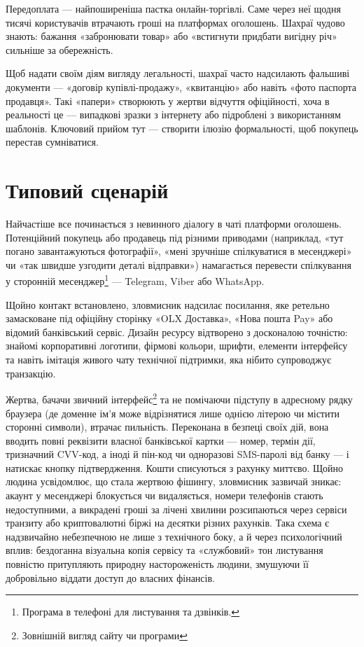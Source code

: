 Передоплата — найпоширеніша пастка онлайн-торгівлі. Саме через неї щодня тисячі користувачів втрачають гроші на платформах оголошень. Шахраї чудово знають: бажання «забронювати товар» або «встигнути придбати вигідну річ» сильніше за обережність.  

Щоб надати своїм діям вигляду легальності, шахраї часто надсилають фальшиві документи — «договір купівлі-продажу», «квитанцію» або навіть «фото паспорта продавця». Такі «папери» створюють у жертви відчуття офіційності, хоча в реальності це — випадкові зразки з інтернету або підроблені з використанням шаблонів. Ключовий прийом тут — створити ілюзію формальності, щоб покупець перестав сумніватися.

\section{Типовий сценарій}

Найчастіше все починається з невинного діалогу в чаті платформи оголошень. Потенційний покупець або продавець під різними приводами (наприклад, «тут погано завантажуються фотографії», «мені зручніше спілкуватися в месенджері» чи «так швидше узгодити деталі відправки») намагається перевести спілкування у сторонній месенджер\footnote{Програма в телефоні для листування та дзвінків.} — Telegram, Viber або WhatsApp. 

\newpage 

Щойно контакт встановлено, зловмисник надсилає посилання, яке ретельно замасковане під офіційну сторінку «OLX Доставка», «Нова пошта Pay» або відомий банківський сервіс. Дизайн ресурсу відтворено з досконалою точністю: знайомі корпоративні логотипи, фірмові кольори, шрифти, елементи інтерфейсу та навіть імітація живого чату технічної підтримки, яка нібито супроводжує транзакцію.

Жертва, бачачи звичний інтерфейс\footnote{Зовнішній вигляд сайту чи програми} та не помічаючи підступу в адресному рядку браузера (де доменне ім’я може відрізнятися лише однією літерою чи містити сторонні символи), втрачає пильність. Переконана в безпеці своїх дій, вона вводить повні реквізити власної банківської картки — номер, термін дії, тризначний CVV-код, а іноді й пін-код чи одноразові SMS-паролі від банку — і натискає кнопку підтвердження. Кошти списуються з рахунку миттєво. Щойно людина усвідомлює, що стала жертвою фішингу, зловмисник зазвичай зникає: акаунт у месенджері блокується чи видаляється, номери телефонів стають недоступними, а викрадені гроші за лічені хвилини розсипаються через сервіси транзиту або криптовалютні біржі на десятки різних рахунків. Така схема є надзвичайно небезпечною не лише з технічного боку, а й через психологічний вплив: бездоганна візуальна копія сервісу та «службовий» тон листування повністю притупляють природну настороженість людини, змушуючи її добровільно віддати доступ до власних фінансів.

